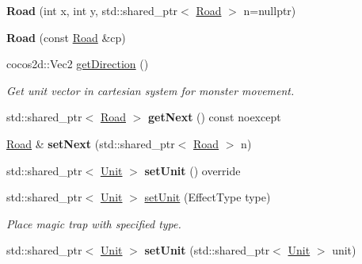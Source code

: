 \begin{DoxyCompactItemize}
\item 
\mbox{\label{classbase__structures_1_1Road_a73d200519ea2258c89c03295d2065e61}} 
{\bfseries Road} (int x, int y, std\+::shared\+\_\+ptr$<$ \hyperlink{classbase__structures_1_1Road}{Road} $>$ n=nullptr)
\item 
\mbox{\label{classbase__structures_1_1Road_a9e00185e6e61f0fdaa52317b7cdc9161}} 
{\bfseries Road} (const \hyperlink{classbase__structures_1_1Road}{Road} \&cp)
\item 
\mbox{\label{classbase__structures_1_1Road_a441e1e67a1a71ce09af90ffbb7936eb1}} 
cocos2d\+::\+Vec2 \hyperlink{classbase__structures_1_1Road_a441e1e67a1a71ce09af90ffbb7936eb1}{get\+Direction} ()
\begin{DoxyCompactList}\small\item\em Get unit vector in cartesian system for monster movement. \end{DoxyCompactList}\item 
\mbox{\label{classbase__structures_1_1Road_ae4e7e342989f5e24e88b35dfd29581ae}} 
std\+::shared\+\_\+ptr$<$ \hyperlink{classbase__structures_1_1Road}{Road} $>$ {\bfseries get\+Next} () const noexcept
\item 
\mbox{\label{classbase__structures_1_1Road_a098a4097bc2c70e2e278d89fbe421644}} 
\hyperlink{classbase__structures_1_1Road}{Road} \& {\bfseries set\+Next} (std\+::shared\+\_\+ptr$<$ \hyperlink{classbase__structures_1_1Road}{Road} $>$ n)
\item 
\mbox{\label{classbase__structures_1_1Road_a0d2670926b73cb4f9de30b3a2b723afe}} 
std\+::shared\+\_\+ptr$<$ \hyperlink{classbase__structures_1_1Unit}{Unit} $>$ {\bfseries set\+Unit} () override
\item 
\mbox{\label{classbase__structures_1_1Road_a50799191b8471b53acdaac3fddf7626a}} 
std\+::shared\+\_\+ptr$<$ \hyperlink{classbase__structures_1_1Unit}{Unit} $>$ \hyperlink{classbase__structures_1_1Road_a50799191b8471b53acdaac3fddf7626a}{set\+Unit} (Effect\+Type type)
\begin{DoxyCompactList}\small\item\em Place magic trap with specified type. \end{DoxyCompactList}\item 
\mbox{\label{classbase__structures_1_1Road_aedbb6ead622d8bfacbf45caf6768d1ed}} 
std\+::shared\+\_\+ptr$<$ \hyperlink{classbase__structures_1_1Unit}{Unit} $>$ {\bfseries set\+Unit} (std\+::shared\+\_\+ptr$<$ \hyperlink{classbase__structures_1_1Unit}{Unit} $>$ unit)
\end{DoxyCompactItemize}
